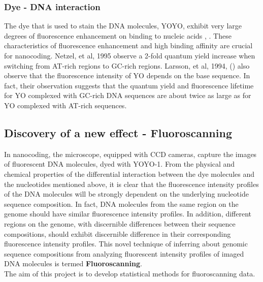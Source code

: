 \subsubsection*{Dye - DNA interaction} 
The dye that is used to stain the DNA molecules, YOYO, exhibit very large degrees of fluorescence enhancement on binding to nucleic acids \cite{Rye_etal_1992_NAR}, \cite{Lee_etal_1986_Cytometry}. These  characteristics of fluorescence enhancement and  high binding affinity are crucial for nanocoding. Netzel, et al, 1995 \cite{Netzel_etal_1995_JPC} observe a 2-fold quantum yield increase when switching from AT-rich regions to GC-rich regions. Larsson, et al, 1994, (\cite{Larsson_etal_1994_JACS}) also observe that the fluorescence intensity of YO depends on the base sequence. In fact, their observation suggests that the quantum yield and fluorescence lifetime for YO complexed with GC-rich DNA sequences are about twice as large as for YO complexed with AT-rich sequences. 

\subsection{Discovery of a new effect - Fluoroscanning}
In nanocoding, the microscope, equipped with CCD cameras, capture the images of fluorescent DNA molecules, dyed with YOYO-1. From the physical and chemical properties of the differential interaction between the dye molecules and the nucleotides mentioned above, it is clear that the fluorescence intensity profiles of the DNA molecules will be strongly dependent on the underlying nucleotide sequence composition. In fact, DNA molecules from the same region on the genome should have similar fluorescence intensity profiles. In addition, different regions on the genome, with discernible differences between their sequence compositions, should exhibit discernible difference in their corresponding fluorescence intensity profiles. This novel technique of inferring about genomic sequence compositions from analyzing fluorescent intensity profiles of imaged DNA molecules is termed {\bf{Fluoroscanning}}. \\

The aim of this project is to develop statistical methods for fluoroscanning data. 

